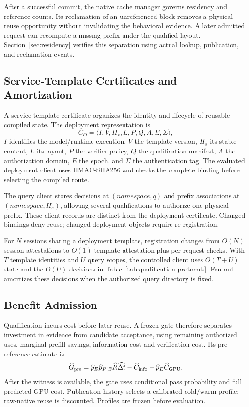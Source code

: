 After a successful commit, the native cache manager governs residency and reference counts. Its reclamation of an unreferenced block removes a physical reuse opportunity without invalidating the behavioral evidence. A later admitted request can recompute a missing prefix under the qualified layout. Section~\ref{sec:residency} verifies this separation using actual lookup, publication, and reclamation events.

\subsection{Service-Template Certificates and Amortization}
\label{sec:template}
A service-template certificate organizes the identity and lifecycle of reusable compiled state. The deployment representation is
\begin{equation}
 C_\Theta=\langle I,V,H_s,L,P,Q,A,E,\Sigma\rangle,
\end{equation}
$I$ identifies the model/runtime execution, $V$ the template version, $H_s$ its stable content, $L$ its layout, $P$ the verifier policy, $Q$ the qualification manifest, $A$ the authorization domain, $E$ the epoch, and $\Sigma$ the authentication tag. The evaluated deployment client uses HMAC-SHA256 and checks the complete binding before selecting the compiled route.

The query client stores decisions at $(\textit{namespace},q)$ and prefix associations at $(\textit{namespace},H_s)$, allowing several qualifications to authorize one physical prefix. These client records are distinct from the deployment certificate. Changed bindings deny reuse; changed deployment objects require re-registration.

For $N$ sessions sharing a deployment template, registration changes from $O(N)$ session attestations to $O(1)$ template attestation plus per-request checks. With $T$ template identities and $U$ query scopes, the controlled client uses $O(T+U)$ state and the $O(U)$ decisions in Table~\ref{tab:qualification-protocols}. Fan-out amortizes these decisions when the authorized query directory is fixed.

\subsection{Benefit Admission}
\label{sec:benefit}
Qualification incurs cost before later reuse. A frozen gate therefore separates investment in evidence from candidate acceptance, using remaining authorized uses, marginal prefill savings, information cost and verification cost. Its pre-reference estimate is
\begin{equation}
 \widehat G_{\rm pre}=\widehat p_E\widehat p_{P\mid E}\widehat R\widehat{\Delta t}
 -\widehat C_{\rm info}-\widehat p_E\widehat C_{\rm GPU}.
\end{equation}
After the witness is available, the gate uses conditional pass probability and full predicted GPU cost. Publication history selects a calibrated cold/warm profile; raw-native reuse is discounted. Profiles are frozen before evaluation.

